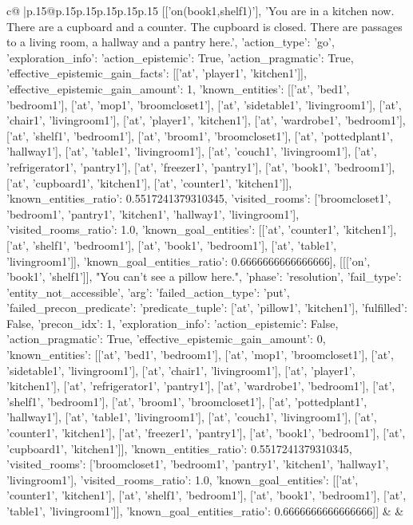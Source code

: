 \documentclass{article}
\begin{document}
{\begin{supertabular}{c@{$\;$}|p{.15\linewidth}@{}p{.15\linewidth}p{.15\linewidth}p{.15\linewidth}p{.15\linewidth}p{.15\linewidth}}
{{{[['on(book1,shelf1)'], 'You are in a kitchen now. There are a cupboard and a counter. The cupboard is closed. There are passages to a living room, a hallway and a pantry here.', {'action_type': 'go', 'exploration_info': {'action_epistemic': True, 'action_pragmatic': True, 'effective_epistemic_gain_facts': [['at', 'player1', 'kitchen1']], 'effective_epistemic_gain_amount': 1, 'known_entities': [['at', 'bed1', 'bedroom1'], ['at', 'mop1', 'broomcloset1'], ['at', 'sidetable1', 'livingroom1'], ['at', 'chair1', 'livingroom1'], ['at', 'player1', 'kitchen1'], ['at', 'wardrobe1', 'bedroom1'], ['at', 'shelf1', 'bedroom1'], ['at', 'broom1', 'broomcloset1'], ['at', 'pottedplant1', 'hallway1'], ['at', 'table1', 'livingroom1'], ['at', 'couch1', 'livingroom1'], ['at', 'refrigerator1', 'pantry1'], ['at', 'freezer1', 'pantry1'], ['at', 'book1', 'bedroom1'], ['at', 'cupboard1', 'kitchen1'], ['at', 'counter1', 'kitchen1']], 'known_entities_ratio': 0.5517241379310345, 'visited_rooms': ['broomcloset1', 'bedroom1', 'pantry1', 'kitchen1', 'hallway1', 'livingroom1'], 'visited_rooms_ratio': 1.0, 'known_goal_entities': [['at', 'counter1', 'kitchen1'], ['at', 'shelf1', 'bedroom1'], ['at', 'book1', 'bedroom1'], ['at', 'table1', 'livingroom1']], 'known_goal_entities_ratio': 0.6666666666666666}}], [[['on', 'book1', 'shelf1']], "You can't see a pillow here.", {'phase': 'resolution', 'fail_type': 'entity_not_accessible', 'arg': {'failed_action_type': 'put', 'failed_precon_predicate': {'predicate_tuple': ['at', 'pillow1', 'kitchen1'], 'fulfilled': False, 'precon_idx': 1}}, 'exploration_info': {'action_epistemic': False, 'action_pragmatic': True, 'effective_epistemic_gain_amount': 0, 'known_entities': [['at', 'bed1', 'bedroom1'], ['at', 'mop1', 'broomcloset1'], ['at', 'sidetable1', 'livingroom1'], ['at', 'chair1', 'livingroom1'], ['at', 'player1', 'kitchen1'], ['at', 'refrigerator1', 'pantry1'], ['at', 'wardrobe1', 'bedroom1'], ['at', 'shelf1', 'bedroom1'], ['at', 'broom1', 'broomcloset1'], ['at', 'pottedplant1', 'hallway1'], ['at', 'table1', 'livingroom1'], ['at', 'couch1', 'livingroom1'], ['at', 'counter1', 'kitchen1'], ['at', 'freezer1', 'pantry1'], ['at', 'book1', 'bedroom1'], ['at', 'cupboard1', 'kitchen1']], 'known_entities_ratio': 0.5517241379310345, 'visited_rooms': ['broomcloset1', 'bedroom1', 'pantry1', 'kitchen1', 'hallway1', 'livingroom1'], 'visited_rooms_ratio': 1.0, 'known_goal_entities': [['at', 'counter1', 'kitchen1'], ['at', 'shelf1', 'bedroom1'], ['at', 'book1', 'bedroom1'], ['at', 'table1', 'livingroom1']], 'known_goal_entities_ratio': 0.6666666666666666}}]] 
	  } 
	   } 
	   } 
	 & & \\ 
 


\end{supertabular}}
\end{document}
